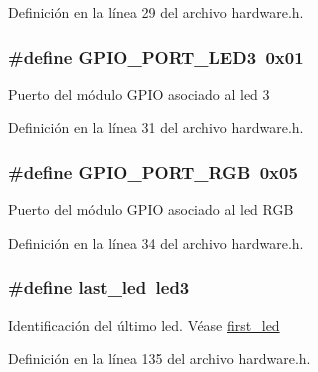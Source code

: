 Definición en la línea 29 del archivo hardware.\+h.

\subsubsection[{\texorpdfstring{G\+P\+I\+O\+\_\+\+P\+O\+R\+T\+\_\+\+L\+E\+D3}{GPIO_PORT_LED3}}]{\setlength{\rightskip}{0pt plus 5cm}\#define G\+P\+I\+O\+\_\+\+P\+O\+R\+T\+\_\+\+L\+E\+D3~0x01}\hypertarget{group__hardware_ga8b63f7f606f2b1ec7d88205ee6c514ea}{}\label{group__hardware_ga8b63f7f606f2b1ec7d88205ee6c514ea}
Puerto del módulo G\+P\+IO asociado al led 3 

Definición en la línea 31 del archivo hardware.\+h.

\subsubsection[{\texorpdfstring{G\+P\+I\+O\+\_\+\+P\+O\+R\+T\+\_\+\+R\+GB}{GPIO_PORT_RGB}}]{\setlength{\rightskip}{0pt plus 5cm}\#define G\+P\+I\+O\+\_\+\+P\+O\+R\+T\+\_\+\+R\+GB~0x05}\hypertarget{group__hardware_ga9e2ed2756af597d0ec2ee618ef235c7e}{}\label{group__hardware_ga9e2ed2756af597d0ec2ee618ef235c7e}
Puerto del módulo G\+P\+IO asociado al led R\+GB 

Definición en la línea 34 del archivo hardware.\+h.

\subsubsection[{\texorpdfstring{last\+\_\+led}{last_led}}]{\setlength{\rightskip}{0pt plus 5cm}\#define last\+\_\+led~{\bf led3}}\hypertarget{group__hardware_ga6d4d3ee57587d8e08816b804150c29f8}{}\label{group__hardware_ga6d4d3ee57587d8e08816b804150c29f8}
Identificación del último led. Véase \hyperlink{group__hardware_ga43a19ad1766c3719e591430d601496f7}{first\+\_\+led} 

Definición en la línea 135 del archivo hardware.\+h.

